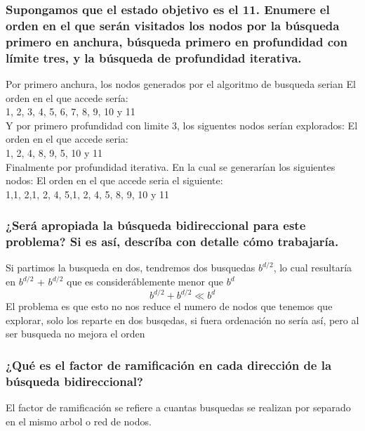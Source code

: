 \documentclass[a4paper,10pt]{article}
\begin{document}
\subsubsection{Supongamos que el estado objetivo es el 11. Enumere el orden en el que serán
visitados los nodos por la búsqueda primero en anchura, búsqueda primero en
profundidad con límite tres, y la búsqueda de profundidad iterativa.}
Por primero anchura, los nodos generados por el algoritmo de busqueda serian
El orden en el que accede sería:\\
\vspace{0.3cm}
1, 2, 3, 4, 5, 6, 7, 8, 9, 10 y 11\\
\vspace{1cm}
Y por primero profundidad con limite 3, los siguentes nodos serían explorados:
El orden en el que accede seria:\\
\vspace{0.3cm}
1, 2, 4, 8, 9, 5, 10 y 11\\
\vspace{1cm}
Finalmente por profundidad iterativa. En la cual se generarían los siguientes nodos:
El orden en el que accede seria el siguiente:\\
\vspace{0.3cm}
1,\hspace{0.3cm}1, 2,\hspace{0.3cm}1, 2, 4, 5,\hspace{0.3cm}1, 2, 4, 5, 8, 9, 10 y 11\\
\subsubsection{¿Será apropiada la búsqueda bidireccional para este problema? Si es así, descríba con detalle cómo trabajaría.}
Si partimos la busqueda en dos, tendremos dos busquedas $b^{d/2}$, lo cual resultaría en $b^{d/2}$ + $b^{d/2}$ que es consideráblemente menor que $b^{d}$
\begin{equation}
	b^{d/2} + b^{d/2} \ll b^{d}
\end{equation}
El problema es que esto no nos reduce el numero de nodos que tenemos que explorar, solo los reparte en dos busqedas, si fuera ordenación no sería así, pero al ser busqueda no mejora el orden
\subsubsection{¿Qué es el factor de ramificación en cada dirección de la búsqueda bidireccional?}
El factor de ramificación se refiere a cuantas busquedas se realizan por separado en el mismo arbol o red de nodos.
\end{document}
